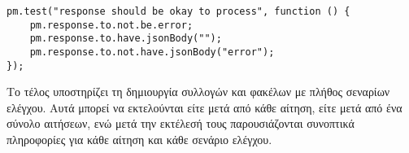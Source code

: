 \begin{lstlisting}[deletekeywords={response}]
pm.test("response should be okay to process", function () {
    pm.response.to.not.be.error;
    pm.response.to.have.jsonBody("");
    pm.response.to.not.have.jsonBody("error");
});
\end{lstlisting}

Το  τέλος υποστηρίζει τη δημιουργία συλλογών και φακέλων με πλήθος σεναρίων ελέγχου.
Αυτά μπορεί να εκτελούνται είτε μετά από κάθε αίτηση,
είτε μετά από ένα σύνολο αιτήσεων,
ενώ μετά την εκτέλεσή τους παρουσιάζονται συνοπτικά πληροφορίες για κάθε αίτηση και κάθε σενάριο ελέγχου. 
